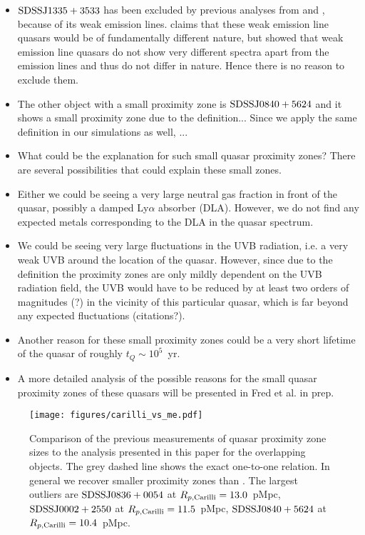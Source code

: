 \documentclass[iop]{emulateapj}
\newcommand{\lya} {Ly$\alpha$\xspace}
\begin{document}
\begin{itemize}
\item $\rm SDSS J1335+3533$ has been excluded by previous analyses from \citet{Fan2006} and \citet{Carilli2010}, because of its weak emission lines. \citet{Carilli2010} claims that these weak emission line quasars would be of fundamentally different nature, but \citet{Diamond-Stanic2009} showed that weak emission line quasars do not show very different spectra apart from the emission lines and thus do not differ in nature. Hence there is no reason to exclude them. 
\item The other object with a small proximity zone is $\rm SDSS J0840+5624$ and it shows a small proximity zone due to the definition... Since we apply the same definition in our simulations as well, ... 
\item What could be the explanation for such small quasar proximity zones? There are several possibilities that could explain these small zones. 
\item Either we could be seeing a very large neutral gas fraction in front of the quasar, possibly a damped \lya absorber (DLA). However, we do not find any expected metals corresponding to the DLA in the quasar spectrum. 
\item We could be seeing very large fluctuations in the UVB radiation, i.e. a very weak UVB around the location of the quasar. However, since due to the definition the proximity zones are only mildly dependent on the UVB radiation field, the UVB would have to be reduced by at least two orders of magnitudes (?) in the vicinity of this particular quasar, which is far beyond any expected fluctuations (citations?). 
\item Another reason for these small proximity zones could be a very short lifetime of the quasar of roughly $t_Q\sim 10^5$~yr. 
\item A more detailed analysis of the possible reasons for the small quasar proximity zones of these quasars will be presented in Fred et al. in prep. 
\end{itemize}

\begin{figure}
\centering
\texttt{[image: figures/carilli\_vs\_me.pdf]}
\caption{Comparison of the previous measurements of quasar proximity zone sizes to the analysis presented in this paper for the overlapping objects. The grey dashed line shows the exact one-to-one relation. In general we recover smaller proximity zones than \citet{Carilli2010}. The largest outliers are $\rm SDSS J0836+0054$ at $R_{p, \rm Carilli} = 13.0$~pMpc, $\rm SDSS J0002+2550$ at $R_{p, \rm Carilli} = 11.5$~pMpc, $\rm SDSS J0840+5624$ at $R_{p, \rm Carilli} = 10.4$~pMpc. \label{fig:carilli}} 
\end{figure}
\end{document}
